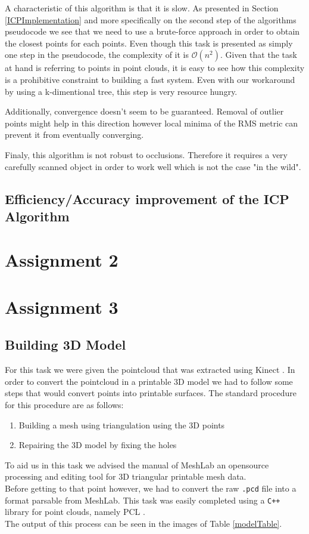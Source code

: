 \documentclass[11pt]{article}
\begin{document}
A characteristic of this algorithm is that it is slow. As presented in Section \ref{ICPImplementation} and more specifically on the second step of the algorithms pseudocode we see that we need to use a brute-force approach in order to obtain the closest points for each points. Even though this task is presented as simply one step in the pseudocode, the complexity of it is $\mathcal{O}(n^2)$. Given that the task at hand is referring to points in point clouds, it is easy to see how this complexity is a prohibitive constraint to building a fast system. Even with our workaround by using a k-dimentional tree, this step is very resource hungry.

Additionally, convergence doesn't seem to be guaranteed. Removal of outlier points might help in this direction however local minima of the RMS metric can prevent it from eventually converging.

Finaly, this algorithm is not robust to occlusions. Therefore it requires a very carefully scanned object in order to work well which is not the case "in the wild".

\subsection{Efficiency/Accuracy improvement of the ICP Algorithm}


\section{Assignment 2}

\section{Assignment 3}

\subsection{Building 3D Model}
For this task we were given the pointcloud that was extracted using Kinect \cite{noInternetInFuckingIstanbulAirportFuckIfIKnow}. In order to convert the pointcloud in a printable 3D model we had to follow some steps that would convert points into printable surfaces. The standard procedure for this procedure are as follows:
\begin{enumerate}
\item Building a mesh using triangulation using the 3D points
\item Repairing the 3D model by fixing the holes
\end{enumerate}
To aid us in this task we advised the manual of MeshLab \cite{noInternetInFuckingIstanbulAirportFuckIfIKnow} an opensource processing and editing tool for 3D triangular printable mesh data.\\
Before getting to that point however, we had to convert the raw \texttt{.pcd} file into a format parsable from MeshLab. This task was easily completed using a \texttt{C++} library for point clouds, namely PCL \cite{TODO}.\\
The output of this process can be seen in the images of Table \ref{modelTable}.
\end{document}

